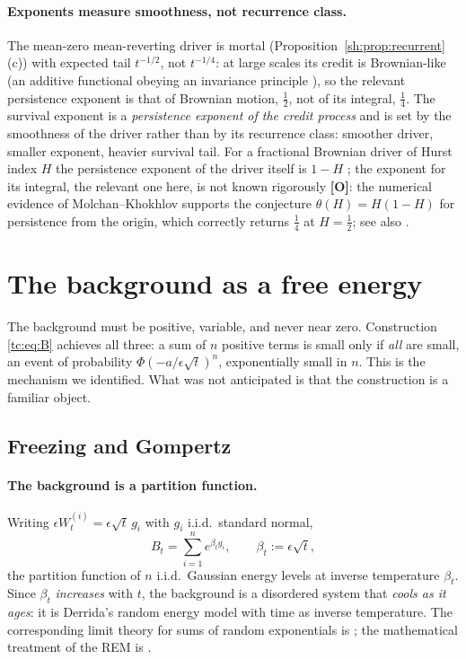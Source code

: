 \documentclass[11pt]{article}
\numberwithin{equation}{section}
\theoremstyle{plain}
\theoremstyle{definition}
\theoremstyle{remark}
\begin{document}
\paragraph{Exponents measure smoothness, not recurrence class.}\label{sh:rem:smoothness}
The mean-zero mean-reverting driver is mortal
(Proposition~\ref{sh:prop:recurrent}(c)) with expected tail $t^{-1/2}$, not
$t^{-1/4}$: at large scales its credit is Brownian-like (an additive
functional obeying an invariance principle \cite{Bha82}), so the relevant
persistence exponent is that of Brownian motion, $\tfrac12$, not of its
integral, $\tfrac14$. The survival exponent is a \emph{persistence exponent
of the credit process} and is set by the smoothness of the driver rather
than by its recurrence class: smoother driver, smaller exponent, heavier
survival tail. For a fractional Brownian driver of Hurst index $H$ the
persistence exponent of the driver itself is $1-H$ \cite{Mol99}; the
exponent for its integral, the relevant one here, is not known
rigorously \textbf{[O]}: the numerical evidence of Molchan--Khokhlov
\cite{MK04} supports the conjecture $\theta(H)=H(1-H)$ for persistence
from the origin, which correctly returns $\tfrac14$ at $H=\tfrac12$;
see also \cite{AS15}.

\section{The background as a free energy}\label{app:background}

\label{tc:sub:background}

The background must be positive, variable, and never near zero.
Construction \eqref{tc:eq:B} achieves all three: a sum of $n$ positive
terms is small only if \emph{all} are small, an event of probability
$\Phi(-a/\epsilon\sqrt t)^{n}$, exponentially small in $n$. This is the
mechanism we identified. What was not anticipated is that the
construction is a familiar object.

\subsection{Freezing and Gompertz}\label{tc:subsub:freezing}

\paragraph{The background is a partition function.}\label{tc:rem:partition}
Writing $\epsilon W^{(i)}_t=\epsilon\sqrt t\,g_i$ with $g_i$ i.i.d.\
standard normal,
\[
B_t=\sum_{i=1}^{n}e^{\beta_t g_i},\qquad \beta_t:=\epsilon\sqrt t,
\]
the partition function of $n$ i.i.d.\ Gaussian energy levels at inverse
temperature $\beta_t$. Since $\beta_t$ \emph{increases} with $t$, the
background is a disordered system that \emph{cools as it ages}: it is
Derrida's random energy model \cite{Der81,Der80} with time as inverse
temperature. The corresponding limit theory for sums of random
exponentials is \cite{BBM05}; the mathematical treatment of the REM is
\cite{Bov06}.
\end{document}
